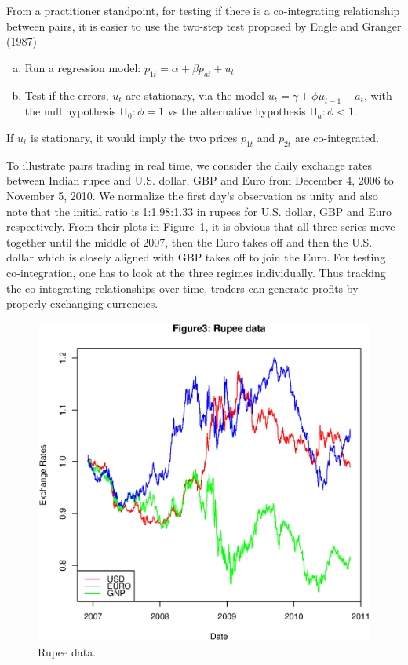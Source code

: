 From a practitioner standpoint, for testing if there is a co-integrating relationship between pairs, it is easier to use the two-step test proposed by Engle and Granger (1987)~\cite{engle1987co}
\begin{enumerate}[a)]
\item Run a regression model: $p_{1t}=\alpha+\beta p_{at} + u_t$

\item Test if the errors, $u_t$ are stationary, via the model $u_t=\gamma+\phi \mu_{t-1}+a_t$, with the null hypothesis $\text{H}_0: \phi=1$ vs  the alternative hypothesis $\text{H}_a: \phi<1$.
\end{enumerate}
If $u_t$ is stationary, it would imply the two prices $p_{1t}$ and $p_{2t}$ are co-integrated.


To illustrate pairs trading in real time, we consider the daily exchange rates between Indian rupee and U.S. dollar, GBP and Euro from December 4, 2006 to November 5, 2010. We normalize the first day's observation as unity and also note that the initial ratio is 1:1.98:1.33 in rupees for U.S. dollar, GBP and Euro respectively. From their plots in Figure~\ref{fig:rupee}, it is obvious that all three series move together until the middle of 2007, then the Euro takes off and then the U.S. dollar which is closely aligned with GBP takes off to join the Euro. For testing co-integration, one has to look at the three regimes individually. Thus tracking the co-integrating relationships over time, traders can generate profits by properly exchanging currencies.


	\begin{figure}[!ht]
	\centering
	\includegraphics[width=\textwidth]{chapters/chapter_stat_ts/figures/473.eps}
	\caption{Rupee data. \label{fig:rupee}}
	\end{figure}

